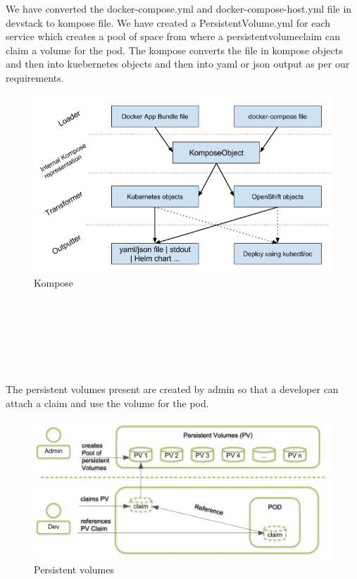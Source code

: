 \documentclass[12pt]{report}
\begin{document}
We have converted the docker-compose.yml and docker-compose-host.yml file in devstack to kompose file. We have created a PersistentVolume.yml for each service which creates a pool of space from where a persistentvolumeclaim can claim a volume for the pod. The kompose converts the file in kompose objects and then into kuebernetes objects and then into yaml or json output as per our requirements.
\begin{figure}[h!]
	\begin{center}
		\includegraphics[totalheight=0.38\textheight]{kompose}
		\caption{Kompose \cite{Kompose}}
	\end{center}
\end{figure}\\\\\\\\\\
\\The persistent volumes present are created by admin so that a developer can attach a claim and use the volume for the pod.
\begin{figure}[h!]
	\begin{center}
		\includegraphics[totalheight=0.33\textheight]{persistentvolumes}
		\caption{Persistent volumes \cite{Persistent}}
	\end{center}
\end{figure}
\end{document}

